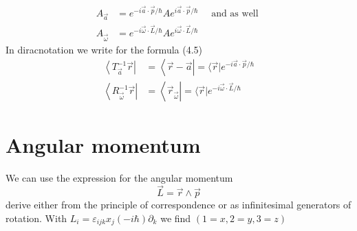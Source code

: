 \begin{equation}
\begin{aligned} A_{\vec{a}} &=e^{-i \vec{a} \cdot \vec{p} / \hbar} A e^{i \vec{a} \cdot \vec{p} / \hbar} \quad \text { and as well } \\ A_{\vec{\omega}} &=e^{-i \vec{\omega} \cdot \vec{L} / \hbar} A e^{i \vec{\omega} \cdot \vec{L} / \hbar} \end{aligned}
\end{equation}
In diracnotation we write for the formula (4.5)
\begin{equation}
\begin{aligned}\left\langle T_{\vec{a}}^{-1} \vec{r}\right| &=\left\langle\vec{r}-\vec{a}\left|=\langle\vec{r}| e^{-i \vec{a} \cdot \vec{p} / \hbar}\right.\right.\\\left\langle R_{\vec{\omega}}^{-1} \vec{r}\right| &=\left\langle\vec{r}_{\vec{\omega}}\left|=\langle\vec{r}| e^{-i \vec{\omega} \cdot \vec{L} / \hbar}\right.\right.\end{aligned}
\end{equation}

\section{Angular momentum}
We can use the expression for the angular momentum
\begin{equation}
    \vec{L}=\vec{r} \wedge \vec{p}
    \end{equation}
derive either from the principle of correspondence or as infinitesimal generators of rotation. With $L_{i}=\varepsilon_{i j k} x_{j}(-i \hbar) \partial_{k}$ we find $(1 = x, 2 = y, 3 = z)$

